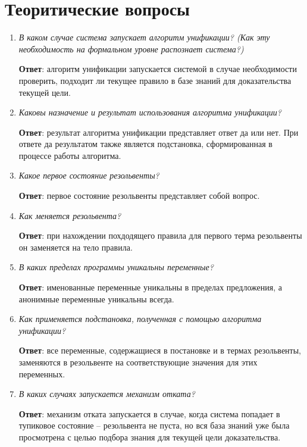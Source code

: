 {\large\section*{Теоритические вопросы}}

\begin{enumerate}
	\item \textit{В каком случае система запускает алгоритм унификации? (Как эту необходимость на формальном уровне распознает система?)}

	\qquad \textbf{Ответ}: алгоритм унификации запускается системой в случае необходимости проверить, подходит ли текущее правило в базе знаний для доказательства текущей цели.

	\item \textit{Каковы назначение и результат использования алгоритма унификации?}
	
	\qquad \textbf{Ответ}: результат алгоритма унификации представляет ответ да или нет. При ответе да результатом также является подстановка, сформированная в процессе работы алгоритма.
	
	\item \textit{Какое первое состояние резольвенты?}
	
	\qquad \textbf{Ответ}: первое состояние резольвенты представляет собой вопрос.

	\item \textit{Как меняется резольвента?}
	
	\qquad \textbf{Ответ}: при нахождении похдодящего правила для первого терма резольвенты он заменяется на тело правила.
	
	\item \textit{В каких пределах программы уникальны переменные?}
	
	\qquad \textbf{Ответ}: именованные переменные уникальны в пределах предложения, а анонимные переменные уникальны всегда.

	\item \textit{Как применяется подстановка, полученная с помощью алгоритма унификации?}
	
	\qquad \textbf{Ответ}: все переменные, содержащиеся в постановке и в термах резольвенты, заменяются в резольвенте на соответствующие значения для этих переменных.
	
	\item \textit{В каких случаях запускается механизм отката?}

	\qquad \textbf{Ответ}: механизм отката запускается в случае, когда система попадает в тупиковое состояние -- резольвента не пуста, но вся база знаний уже была просмотрена с целью подбора знания для текущей цели доказательства.
\end{enumerate}

